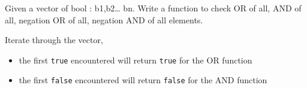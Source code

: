 \documentclass{exam}%
\newcommand*{\ANCOASTAT}{}%
\begin{document}
\begin{questions}
\question Given a vector of bool : b1,b2… bn. Write a function to check OR of all, AND of all, negation OR of all, negation AND of all elements.
\begin{solution}[.2in]
Iterate through the vector, 
\begin{itemize}
	\item the first \lstinline{true} encountered will return \lstinline{true} for the OR function
	\item the first \lstinline{false} encountered will return \lstinline{false} for the AND function
\end{itemize}
\end{solution}


\end{questions}
\fi
\ifdefined\ANCOASTAT
\newpage
\end{document}
